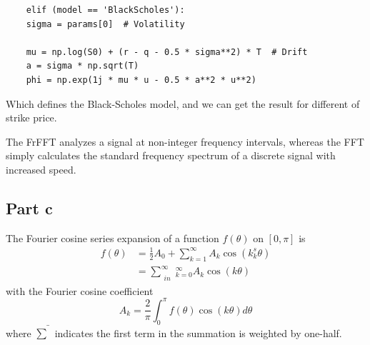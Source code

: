 \documentclass[letterpaper]{article}
\begin{document}
   \begin{lstlisting}
   	elif (model == 'BlackScholes'):
   	sigma = params[0]  # Volatility
   	
   	mu = np.log(S0) + (r - q - 0.5 * sigma**2) * T  # Drift
   	a = sigma * np.sqrt(T)  
   	phi = np.exp(1j * mu * u - 0.5 * a**2 * u**2) 
   \end{lstlisting} 

   Which defines the Black-Scholes model, and we can get the result for different of strike price. 


 \begin{table}[h!]
	\centering
	\caption{Results for Different Values of $K$}
\end{table}
	  

	  The FrFFT analyzes a signal at non-integer frequency intervals, whereas the FFT simply calculates the standard frequency spectrum of a discrete signal with increased speed.
	  
	  \subsection{Part c}
	  
	  The Fourier cosine series expansion of a function $f(\theta)$ on $[0, \pi]$ is
	  $$
	  \begin{aligned}
	  	f(\theta) & =\frac{1}{2} A_{0}+\sum_{k=1}^{\infty} A_{k} \cos \left(k_{k}^{s} \theta\right) \\
	  	& =\sum_{\substack{i n}}^{\infty}{ }_{k=0}^{\infty} A_{k} \cos (k \theta)
	  \end{aligned}
	  $$
	  with the Fourier cosine coefficient
	  $$
	  A_{k}=\frac{2}{\pi} \int_{0}^{\pi} f(\theta) \cos (k \theta) d \theta
	  $$
	  where $\bar{\sum}$ indicates the first term in the summation is weighted by one-half.
	  
\end{document}

